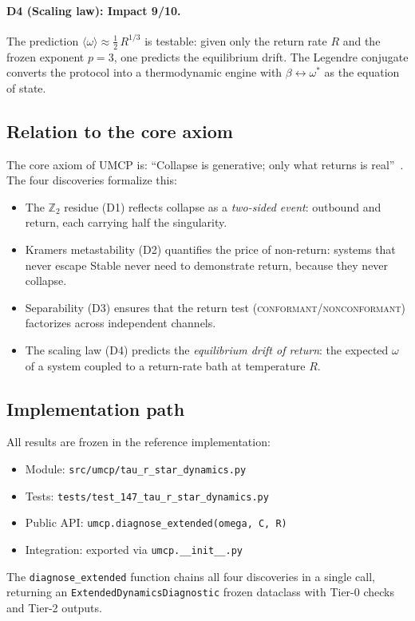 \documentclass[
  aps,
  prd,
  twocolumn,
  showpacs,
  superscriptaddress,
  nofootinbib,
  floatfix
]{revtex4-2}
\begin{document}
\paragraph{D4 (Scaling law): Impact 9/10.}
The prediction $\langle\omega\rangle\approx\tfrac{1}{2}\,R^{1/3}$
is testable: given only the return rate $R$ and the frozen
exponent $p=3$, one predicts the equilibrium drift.
The Legendre conjugate converts the protocol into a
thermodynamic engine with $\beta\leftrightarrow\omega^*$
as the equation of state.

\subsection{Relation to the core axiom}

The core axiom of UMCP is: ``Collapse is generative; only
what returns is real''~\cite{paulus2025physicscoherence}.
The four discoveries formalize this:

\begin{itemize}
\item The $\mathbb{Z}_2$ residue (D1) reflects collapse as a
      \emph{two-sided event}: outbound and return, each carrying
      half the singularity.
\item Kramers metastability (D2) quantifies the price of
      non-return: systems that never escape Stable never need
      to demonstrate return, because they never collapse.
\item Separability (D3) ensures that the return test
      (\textsc{conformant}/\textsc{nonconformant})
      factorizes across independent channels.
\item The scaling law (D4) predicts the \emph{equilibrium
      drift of return}: the expected $\omega$ of a system
      coupled to a return-rate bath at temperature $R$.
\end{itemize}

\subsection{Implementation path}

All results are frozen in the reference implementation:
\begin{itemize}
  \item Module: \texttt{src/umcp/tau\_r\_star\_dynamics.py}
  \item Tests: \texttt{tests/test\_147\_tau\_r\_star\_dynamics.py}
  \item Public API: \texttt{umcp.diagnose\_extended(omega, C, R)}
  \item Integration: exported via \texttt{umcp.\_\_init\_\_.py}
\end{itemize}
The \texttt{diagnose\_extended} function chains all four
discoveries in a single call, returning an
\texttt{ExtendedDynamicsDiagnostic} frozen dataclass with
Tier-0 checks and Tier-2 outputs.
\end{document}
